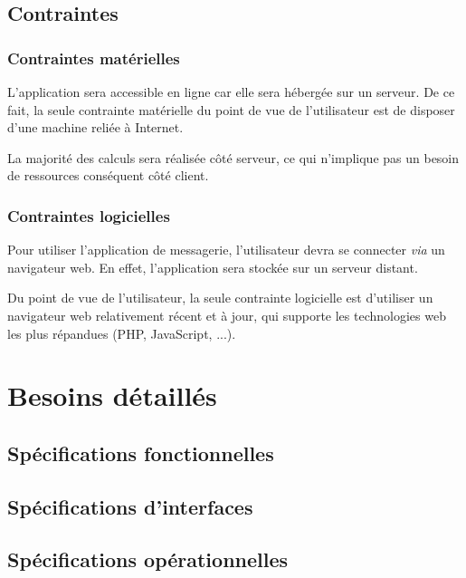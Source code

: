 \documentclass[11pt,dvipsnames,svgnames]{report}
\begin{document}
\section{Contraintes}
\subsection{Contraintes matérielles}
L'application sera accessible en ligne car elle sera hébergée sur un serveur. De ce fait, la seule contrainte matérielle du point de vue de l'utilisateur est de disposer d'une machine reliée à Internet. 

La majorité des calculs sera réalisée côté serveur, ce qui n'implique pas un besoin de ressources conséquent côté client.

\subsection{Contraintes logicielles}
Pour utiliser l'application de messagerie, l'utilisateur devra se connecter \emph{via} un navigateur web. En effet, l'application sera stockée sur un serveur distant. 

Du point de vue de l'utilisateur, la seule contrainte logicielle est d'utiliser un navigateur web relativement récent et à jour, qui supporte les technologies web les plus répandues (PHP, JavaScript, ...).


\chapter{Besoins détaillés}
\section{Spécifications fonctionnelles}

\section{Spécifications d'interfaces}

\section{Spécifications opérationnelles}
\end{document}

